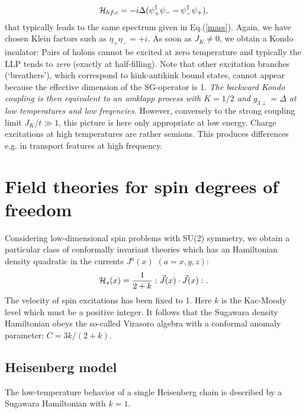 \begin{equation}
{\cal H}_{hf,c}=-i\Delta(\psi_{+}^{\dag}\psi_{-}-\psi_{-}^{\dag}\psi_{+}),
\end{equation}
that typically leads to the same spectrum given in Eq.(\ref{mass}). Again, we
have chosen Klein factors such as $\eta_+\eta_-=+i$. 
As soon as $J_K\neq 0$, we obtain a Kondo insulator:
Pairs of holons cannot be excited at zero temperature and typically the LLP
tends to {\it zero} (exactly at half-filling). Note that other
excitation branches (`breathers'), which correspond to kink-antikink bound
states, cannot appear because the effective dimension of the
SG-operator is 1. 
\vskip 0.25cm
\emph{The backward Kondo coupling is then
equivalent to an umklapp process with $K=1/2$ and $g_{3\perp}=\Delta$ at
low temperatures and low freqencies.} However, conversely to the strong
coupling limit $J_K/t\gg 1$, this picture is here only
appropriate at low energy. 
Charge excitations at high temperatures are rather semions. This produces
differences e.g. in transport features at high frequency.


\section{Field theories for spin degrees of freedom}

Considering low-dimensional
spin problems with SU(2) symmetry, we obtain a particular class of 
conformally invariant theories
which has an Hamiltonian density quadratic in the currents 
$J^a(x)$ $(a=x,y,z)$\cite{Affleck_boso}: 
\begin{equation}
\label{h}
{\cal H}_s(x)=\frac{1}{2+k}: {\vec J}(x)\cdot {\vec J}(x):.
\end{equation}
The velocity of spin excitations has been fixed to 1.
Here $k$ is the Kac-Moody level which must be a positive integer.
It follows that the 
Sugawara density Hamiltonian obeys the so-called Virasoro algebra with a
conformal anomaly parameter: $C=3k/(2+k)$. 

\subsection{Heisenberg model}

The low-temperature behavior of a single Heisenberg chain is 
described by a Sugawara Hamiltonian with $k=1$.
  
